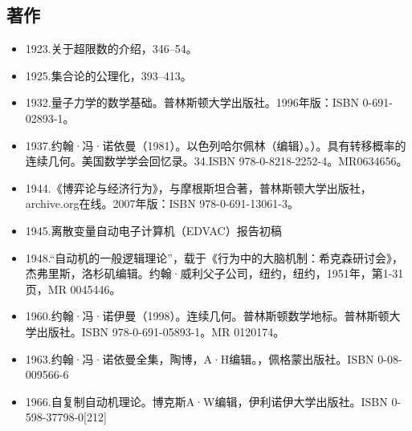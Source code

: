 \subsection{著作}
\begin{itemize}
\item 1923.关于超限数的介绍，346–54。
\item 1925.集合论的公理化，393–413。
\item 1932.量子力学的数学基础。普林斯顿大学出版社。1996年版：ISBN 0-691-02893-1。
\item 1937.约翰·冯·诺依曼（1981）。以色列哈尔佩林（编辑）。）。具有转移概率的连续几何。美国数学学会回忆录。34.ISBN 978-0-8218-2252-4。MR0634656。
\item 1944.《博弈论与经济行为》，与摩根斯坦合著，普林斯顿大学出版社，archive.org在线。2007年版：ISBN 978-0-691-13061-3。
\item 1945.离散变量自动电子计算机（EDVAC）报告初稿
\item 1948.“自动机的一般逻辑理论”，载于《行为中的大脑机制：希克森研讨会》，杰弗里斯，洛杉矶编辑。约翰·威利父子公司，纽约，纽约，1951年，第1-31页，MR 0045446。
\item 1960.约翰·冯·诺伊曼（1998）。连续几何。普林斯顿数学地标。普林斯顿大学出版社。ISBN 978-0-691-05893-1。MR 0120174。
\item 1963.约翰·冯·诺依曼全集，陶博，A·H编辑。，佩格蒙出版社。ISBN 0-08-009566-6
\item 1966.自复制自动机理论。博克斯A·W编辑，伊利诺伊大学出版社。ISBN 0-598-37798-0[212]
\end{itemize}
